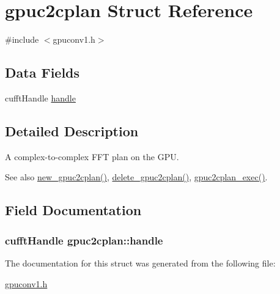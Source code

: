 \hypertarget{structgpuc2cplan}{
\section{gpuc2cplan Struct Reference}
\label{structgpuc2cplan}
}


{\ttfamily \#include $<$gpuconv1.h$>$}

\subsection*{Data Fields}
\begin{DoxyCompactItemize}
\item 
cufftHandle \hyperlink{structgpuc2cplan_a0ab40925b8035911899012e89c699c23}{handle}
\end{DoxyCompactItemize}


\subsection{Detailed Description}
A complex-\/to-\/complex FFT plan on the GPU. \begin{DoxySeeAlso}{See also}
\hyperlink{gpuconv1_8h_a7f9fff8937542904f3822c36dc968519}{new\_\-gpuc2cplan()}, \hyperlink{gpuconv1_8h_a2b2b2adffd7de89165c17057066d018a}{delete\_\-gpuc2cplan()}, \hyperlink{gpuconv1_8h_aa6c8d327b2dda097866d1a520ca29845}{gpuc2cplan\_\-exec()}. 
\end{DoxySeeAlso}


\subsection{Field Documentation}
\hypertarget{structgpuc2cplan_a0ab40925b8035911899012e89c699c23}{
\subsubsection[{handle}]{\setlength{\rightskip}{0pt plus 5cm}cufftHandle {\bf gpuc2cplan::handle}}}
\label{structgpuc2cplan_a0ab40925b8035911899012e89c699c23}


The documentation for this struct was generated from the following file:\begin{DoxyCompactItemize}
\item 
\hyperlink{gpuconv1_8h}{gpuconv1.h}\end{DoxyCompactItemize}
